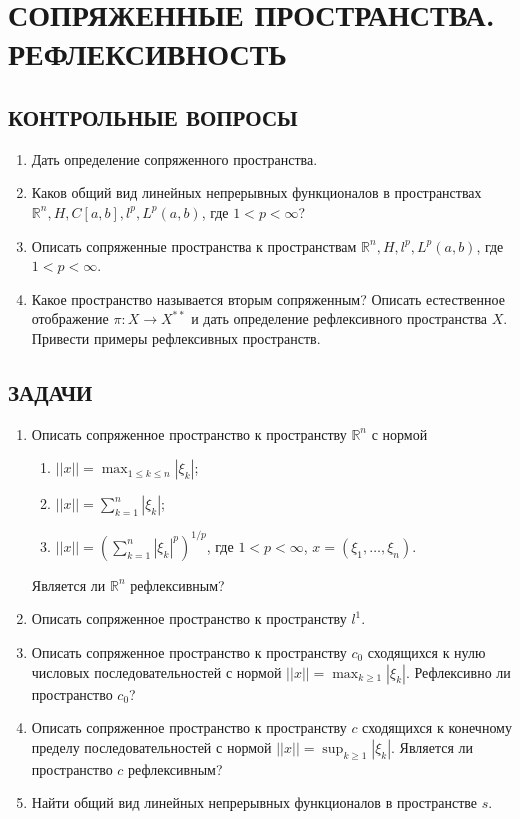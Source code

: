 \documentclass[12pt,a4paper]{article}
\begin{document}
\section{СОПРЯЖЕННЫЕ ПРОСТРАНСТВА. РЕФЛЕКСИВНОСТЬ}

\subsection*{КОНТРОЛЬНЫЕ ВОПРОСЫ}
\begin{enumerate}
\item Дать определение сопряженного пространства.
\item Каков общий вид линейных непрерывных функционалов в пространствах $\mathbb{R}^{n}, H, C[a,b], l^{p}, L^{p}(a,b)$, где $1 < p < \infty$?
\item Описать сопряженные пространства к пространствам $\mathbb{R}^{n}, H, l^{p}, L^{p}(a,b)$, где $1 < p < \infty$.
\item Какое пространство называется вторым сопряженным? Описать естественное отображение $\pi: X \rightarrow X^{**}$ и дать определение рефлексивного пространства $X$. Привести примеры рефлексивных пространств.
\end{enumerate}

\subsection*{ЗАДАЧИ}
\begin{enumerate}
\item Описать сопряженное пространство к пространству $\mathbb{R}^{n}$ с нормой
\begin{enumerate}[label=\alph*)]
\item $||x|| = \max_{1 \le k \le n} |\xi_{k}|$;
\item $||x|| = \sum_{k=1}^{n} |\xi_{k}|$;
\item $||x|| = (\sum_{k=1}^{n} |\xi_{k}|^{p})^{1/p}$, где $1 < p < \infty$, $x = (\xi_{1}, \dots, \xi_{n})$.
\end{enumerate}
Является ли $\mathbb{R}^{n}$ рефлексивным?

\item Описать сопряженное пространство к пространству $l^{1}$.

\item Описать сопряженное пространство к пространству $c_{0}$ сходящихся к нулю числовых последовательностей с нормой $||x|| = \max_{k \ge 1} |\xi_{k}|$. Рефлексивно ли пространство $c_{0}$?

\item Описать сопряженное пространство к пространству $c$ сходящихся к конечному пределу последовательностей с нормой $||x|| = \sup_{k \ge 1} |\xi_{k}|$. Является ли пространство $c$ рефлексивным?

\item Найти общий вид линейных непрерывных функционалов в пространстве $s$.
\end{enumerate}
\end{document}
